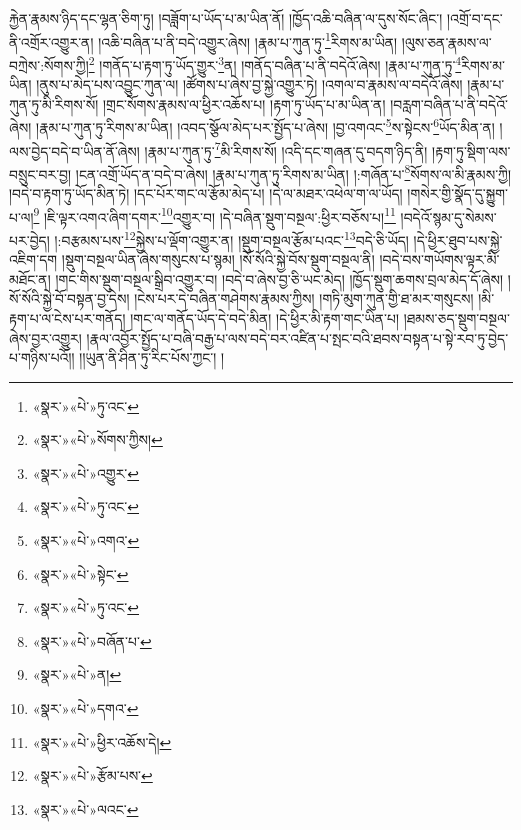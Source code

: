 རྐྱེན་རྣམས་ཉིད་དང་ལྷན་ཅིག་ཏུ། །བཟློག་པ་ཡོད་པ་མ་ཡིན་ནོ། །ཁྱོད་འཆི་བཞིན་ལ་དུས་སོང་ཞིང་། །འགྲོ་བ་དང་ནི་འགྲོར་འགྱུར་ན། །འཆི་བཞིན་པ་ནི་བདེ་འགྱུར་ཞེས། །རྣམ་པ་ཀུན་ཏུ་\footnote{«སྣར་»«པེ་»ཏུ་འང་}རིགས་མ་ཡིན། །ལུས་ཅན་རྣམས་ལ་བཀྲེས་:སོགས་ཀྱི།\footnote{«སྣར་»«པེ་»སོགས་ཀྱིས།} །གནོད་པ་རྟག་ཏུ་ཡོད་གྱུར་\footnote{«སྣར་»«པེ་»འགྱུར་}ན། །གནོད་བཞིན་པ་ནི་བདེའོ་ཞེས། །རྣམ་པ་ཀུན་ཏུ་\footnote{«སྣར་»«པེ་»ཏུ་འང་}རིགས་མ་ཡིན། །ནུས་པ་མེད་པས་འབྱུང་ཀུན་ལ། །ཚོགས་པ་ཞེས་བྱ་སྐྱེ་འགྱུར་ཏེ། །འགལ་བ་རྣམས་ལ་བདེའོ་ཞེས། །རྣམ་པ་ཀུན་ཏུ་མི་རིགས་སོ། །གྲང་སོགས་རྣམས་ལ་ཕྱིར་འཆོས་པ། །རྟག་ཏུ་ཡོད་པ་མ་ཡིན་ན། །བརླག་བཞིན་པ་ནི་བདེའོ་ཞེས། །རྣམ་པ་ཀུན་ཏུ་རིགས་མ་ཡིན། །འབད་སྩོལ་མེད་པར་སྤྱོད་པ་ཞེས། །བྱ་འགའང་\footnote{«སྣར་»«པེ་»འགའ་}ས་སྟེངས་\footnote{«སྣར་»«པེ་»སྟེང་}ཡོད་མིན་ན། །ལས་བྱེད་བདེ་བ་ཡིན་ནོ་ཞེས། །རྣམ་པ་ཀུན་ཏུ་\footnote{«སྣར་»«པེ་»ཏུ་འང་}མི་རིགས་སོ། །འདི་དང་གཞན་དུ་བདག་ཉིད་ནི། །རྟག་ཏུ་སྡིག་ལས་བསྲུང་བར་བྱ། །ངན་འགྲོ་ཡོད་ན་བདེ་བ་ཞེས། །རྣམ་པ་ཀུན་ཏུ་རིགས་མ་ཡིན། །:གཞོན་པ་\footnote{«སྣར་»«པེ་»བཞོན་པ་}སོགས་ལ་མི་རྣམས་ཀྱི། །བདེ་བ་རྟག་ཏུ་ཡོད་མིན་ཏེ། །དང་པོར་གང་ལ་རྩོམ་མེད་པ། །དེ་ལ་མཐར་འཕེལ་ག་ལ་ཡོད། །གསེར་གྱི་སྣོད་དུ་སྐྱུག་པ་ལ།\footnote{«སྣར་»«པེ་»ན།} །ཇི་ལྟར་འགའ་ཞིག་དགར་\footnote{«སྣར་»«པེ་»དགའ་}འགྱུར་བ། །དེ་བཞིན་སྡུག་བསྔལ་:ཕྱིར་བཅོས་པ།\footnote{«སྣར་»«པེ་»ཕྱིར་འཆོས་དེ།} །བདེའོ་སྙམ་དུ་སེམས་པར་བྱེད། །:བརྩམས་པས་\footnote{«སྣར་»«པེ་»རྩོམ་པས་}སྐྱེས་པ་ལྡོག་འགྱུར་ན། །སྡུག་བསྔལ་རྩོམ་པའང་\footnote{«སྣར་»«པེ་»ལའང་}བདེ་ཅི་ཡོད། །དེ་ཕྱིར་ཐུབ་པས་སྐྱེ་འཇིག་དག །སྡུག་བསྔལ་ཡིན་ཞེས་གསུངས་པ་སྙམ། །སོ་སོའི་སྐྱེ་བོས་སྡུག་བསྔལ་ནི། །བདེ་བས་གཡོགས་ལྟར་མི་མཐོང་ན། །གང་གིས་སྡུག་བསྔལ་སྒྲིབ་འགྱུར་བ། །བདེ་བ་ཞེས་བྱ་ཅི་ཡང་མེད། །ཁྱོད་སྡུག་ཆགས་བྲལ་མེད་དོ་ཞེས། །སོ་སོའི་སྐྱེ་བོ་བསྟན་བྱ་དེས། །ངེས་པར་དེ་བཞིན་གཤེགས་རྣམས་ཀྱིས། །གཏི་མུག་ཀུན་གྱི་ཐ་མར་གསུངས། །མི་རྟག་པ་ལ་ངེས་པར་གནོད། །གང་ལ་གནོད་ཡོད་དེ་བདེ་མིན། །དེ་ཕྱིར་མི་རྟག་གང་ཡིན་པ། །ཐམས་ཅད་སྡུག་བསྔལ་ཞེས་བྱར་འགྱུར། །རྣལ་འབྱོར་སྤྱོད་པ་བཞི་བརྒྱ་པ་ལས་བདེ་བར་འཛིན་པ་སྤང་བའི་ཐབས་བསྟན་པ་སྟེ་རབ་ཏུ་བྱེད་པ་གཉིས་པའོ།། །།ཡུན་ནི་ཤིན་ཏུ་རིང་པོས་ཀྱང་། །
